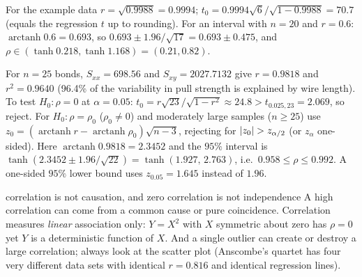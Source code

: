 \begin{example}
For the example data $r=\sqrt{0.9988}=0.9994$; $t_0=0.9994\sqrt6/\sqrt{1-0.9988}=70.7$ (equals the regression $t$ up to rounding). For an interval with $n=20$ and $r=0.6$: $\operatorname{arctanh}0.6=0.693$, so $0.693\pm1.96/\sqrt{17}=0.693\pm0.475$, and $\rho\in(\tanh0.218,\tanh1.168)=(0.21,0.82)$.
\end{example}

\begin{example}
For $n=25$ bonds, $S_{xx}=698.56$ and $S_{xy}=2027.7132$ give $r=0.9818$ and $r^2=0.9640$ (96.4\% of the variability in pull strength is explained by wire length). To test $H_0:\rho=0$ at $\alpha=0.05$: $t_0=r\sqrt{23}/\sqrt{1-r^2}\approx24.8>t_{0.025,23}=2.069$, so reject. For $H_0:\rho=\rho_0$ ($\rho_0\ne0$) and moderately large samples ($n\ge25$) use $z_0=(\operatorname{arctanh}r-\operatorname{arctanh}\rho_0)\sqrt{n-3}$, rejecting for $\lvert z_0\rvert>z_{\alpha/2}$ (or $z_\alpha$ one-sided). Here $\operatorname{arctanh}0.9818=2.3452$ and the $95\%$ interval is $\tanh(2.3452\pm1.96/\sqrt{22})=\tanh(1.927,\,2.763)$, i.e.\ $0.958\le\rho\le0.992$. A one-sided $95\%$ lower bound uses $z_{0.05}=1.645$ instead of $1.96$.
\end{example}

\begin{pitfall}{correlation is not causation, and zero correlation is not independence}
A high correlation can come from a common cause or pure coincidence. Correlation measures \emph{linear} association only: $Y=X^2$ with $X$ symmetric about zero has $\rho=0$ yet $Y$ is a deterministic function of $X$. And a single outlier can create or destroy a large correlation; always look at the scatter plot (Anscombe's quartet has four very different data sets with identical $r=0.816$ and identical regression lines).
\end{pitfall}


